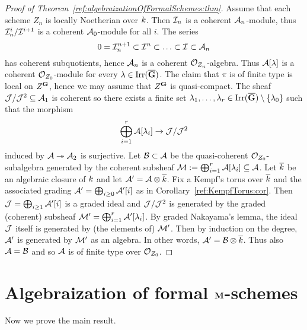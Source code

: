 \begin{proof}[Proof of Theorem~\ref{ref:algebraizationOfFormalSchemes:thm}]
Assume that each scheme $Z_n$ is locally Noetherian over $k$. Then ${\mathcal I}_n$
is a coherent ${\mathcal A}_n$-module, thus ${\mathcal I}_n^i/{\mathcal I}^{i+1}$ is a coherent
${\mathcal A}_0$-module for all $i$. The series
\[
    0 = {\mathcal I}_n^{n+1} \subset {\mathcal I}^n \subset  \ldots \subset {\mathcal I} \subset {\mathcal A}_n
\]
has coherent subquotients, hence ${\mathcal A}_n$ is a coherent ${\mathcal O}_{Z_n}$-algebra.
Thus ${\mathcal A}[\lambda]$ is a coherent ${\mathcal O}_{Z_0}$-module for every
$\lambda\in \operatorname{Irr}(\overline{\mathbf{G}})$. The claim that $\pi$ is of finite type is local on
$Z^{\mathbf{G}}$, hence we may
assume that $Z^{\mathbf{G}}$ is quasi-compact.
The sheaf ${\mathcal J}/{\mathcal J}^2\subseteq {\mathcal A}_1$ is coherent so there exists a finite set
$\lambda_1, \ldots, \lambda_r\in \operatorname{Irr}(\overline{\mathbf{G}})\setminus \{\lambda_0\}$ such that the morphism
\[
    \bigoplus_{i=1}^r{\mathcal A}[\lambda_i]\rightarrow {\mathcal J}/{\mathcal J}^2
\]
induced by ${\mathcal A}\twoheadrightarrow {\mathcal A}_2$ is surjective. Let ${\mathcal B} \subset {\mathcal A}$
be the quasi-coherent ${\mathcal O}_{Z_0}$-subalgebra generated by the coherent
subsheaf ${\mathcal M} := \bigoplus_{i=1}^r{\mathcal A}[\lambda_i]\subseteq {\mathcal A}$.
Let $\overline{k}$ be an algebraic closure of $k$ and let ${\mathcal A}' = {\mathcal A} \otimes
\overline{k}$. Fix a Kempf's torus over
$\overline{k}$ and the associated grading ${\mathcal A}' = \bigoplus_{i\geq 0}
{\mathcal A}'[i]$ as in
Corollary~\ref{ref:KempfTorus:cor}.
Then ${\mathcal J} = \bigoplus_{i\geq 1} {\mathcal A}'[i]$ is a graded ideal and ${\mathcal J}/{\mathcal J}^2$ is
generated by the graded (coherent) subsheaf ${\mathcal M}' = \bigoplus_{i=1}^r{\mathcal A}'[\lambda_i]$. By
graded Nakayama's lemma, the ideal ${\mathcal J}$ itself is generated by (the elements
of) ${\mathcal M}'$. Then by induction on the degree, ${\mathcal A}'$ is generated by ${\mathcal M}'$ as
an algebra. In other words, ${\mathcal A}' = {\mathcal B}\otimes \overline{k}$. Thus also ${\mathcal A} = {\mathcal B}$ and so ${\mathcal A}$ is of
finite type over ${\mathcal O}_{Z_0}$.
\end{proof}

\section{Algebraization of formal $\mathbf{M}$-schemes}
\noindent
Now we prove the main result.

